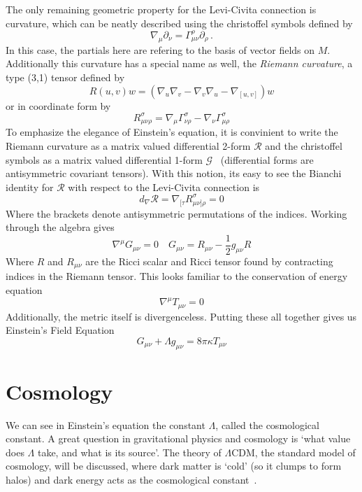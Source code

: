 The only remaining geometric property for the Levi-Civita connection is curvature, which can be neatly described using the christoffel symbols defined by
\begin{equation}
    \nabla_\mu\partial_\nu = \Gamma^{\rho}_{\mu\nu}\partial_\rho\,.
\end{equation}
In this case, the partials here are refering to the basis of vector fields on $M$. Additionally this curvature has a special name as well, the \textit{Riemann curvature}, a type (3,1) tensor defined by
\begin{equation}
    R(u,v)w = (\nabla_u\nabla_v-\nabla_v\nabla_u - \nabla_{[u,v]})w
\end{equation}
or in coordinate form by
\begin{equation}
    R_{\mu\nu\rho}^\sigma  = \nabla_\mu \Gamma^\sigma_{\nu\rho} - \nabla_\nu\Gamma^{\sigma}_{\mu\rho}
\end{equation}
To emphasize the elegance of Einstein's equation, it is convinient to write the Riemann curvature as a matrix valued differential 2-form $\mathcal{R}$ and the christoffel symbols as a matrix valued differential 1-form $\mathcal{G}$~\cite{baez_john_gauge_1994} (differential forms are antisymmetric covariant tensors). With this notion, its easy to see the Bianchi identity for $\mathcal{R}$ with respect to the Levi-Civita connection is
\begin{equation}
    d_{\nabla}\mathcal{R} = \nabla_{[\tau}R^\sigma_{\mu\nu]\rho} = 0
\end{equation}
Where the brackets denote antisymmetric permutations of the indices. Working through the algebra gives
\begin{equation}
    \nabla^\mu G_{\mu\nu} = 0\quad G_{\mu\nu} = R_{\mu\nu}-\frac{1}{2}g_{\mu\nu}R
\end{equation}
Where $R$ and $R_{\mu\nu}$ are the Ricci scalar and Ricci tensor found by contracting indices in the Riemann tensor. This looks familiar to the conservation of energy equation
\begin{equation}
    \nabla^\mu T_{\mu\nu}=0
\end{equation}
Additionally, the metric itself is divergenceless. Putting these all together gives us Einstein's Field Equation
\begin{equation}
    G_{\mu\nu} + \Lambda g_{\mu\nu} = 8\pi\kappa T_{\mu\nu}
\end{equation}

\section{Cosmology}
We can see in Einstein's equation the constant $\Lambda$, called the cosmological constant. A great question in gravitational physics and cosmology is `what value does $\Lambda$ take, and what is its source'. The theory of $\Lambda$CDM, the standard model of cosmology, will be discussed, where dark matter is `cold' (so it clumps to form halos) and dark energy acts as the cosmological constant~\cite{scott_dodelson_modern_2021}.

